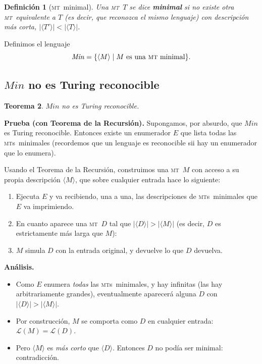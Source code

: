 \documentclass[11pt,a4paper]{article}
\theoremstyle{definicion}
\newtheorem{definicion}{Definición}[section]
\newtheorem{teorema}[definicion]{Teorema}
\newcommand{\MT}{\textsc{mt}}
\newcommand{\MTs}{\textsc{mt}s}
\newcommand{\enc}[1]{\langle #1 \rangle}
\newcommand{\Lang}{\mathcal{L}}
\begin{document}
\begin{definicion}[\MT\ minimal]
Una \MT\ $T$ se dice \textbf{minimal} si no existe otra \MT\ equivalente a $T$ (es decir, que reconozca el mismo lenguaje) con descripción \emph{más corta}, $|\enc{T'}| < |\enc{T}|$.
\end{definicion}

Definimos el lenguaje
\[
\mathit{Min} = \{ \enc{M} \mid M \text{ es una \MT\ minimal} \}.
\]

\subsection{$\mathit{Min}$ no es Turing reconocible}

\begin{teorema}
$\mathit{Min}$ no es Turing reconocible.
\end{teorema}

\textbf{Prueba (con Teorema de la Recursión).} Supongamos, por absurdo, que $\mathit{Min}$ es Turing reconocible. Entonces existe un enumerador $E$ que lista todas las \MTs\ minimales (recordemos que un lenguaje es reconocible sii hay un enumerador que lo enumera).

Usando el Teorema de la Recursión, construimos una \MT\ $M$ con acceso a su propia descripción $\enc{M}$, que sobre cualquier entrada hace lo siguiente:
\begin{enumerate}
    \item Ejecuta $E$ y va recibiendo, una a una, las descripciones de \MTs\ minimales que $E$ va imprimiendo.
    \item En cuanto aparece una \MT\ $D$ tal que $|\enc{D}| > |\enc{M}|$ (es decir, $D$ es estrictamente más larga que $M$):
    \item $M$ simula $D$ con la entrada original, y devuelve lo que $D$ devuelva.
\end{enumerate}

\textbf{Análisis.}
\begin{itemize}
    \item Como $E$ enumera \emph{todas} las \MTs\ minimales, y hay infinitas (las hay arbitrariamente grandes), eventualmente aparecerá alguna $D$ con $|\enc{D}| > |\enc{M}|$.
    \item Por construcción, $M$ se comporta como $D$ en cualquier entrada: $\Lang(M) = \Lang(D)$.
    \item Pero $\enc{M}$ es \emph{más corto} que $\enc{D}$. Entonces $D$ no podía ser minimal: contradicción.
\end{itemize}
\end{document}
